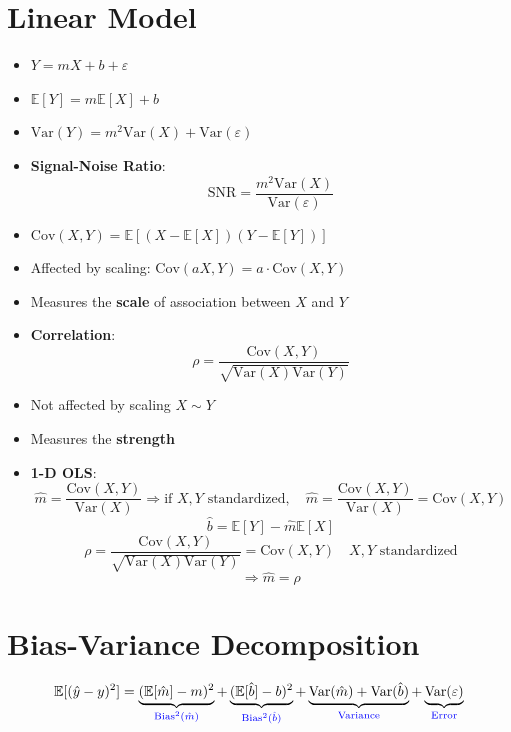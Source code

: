 \documentclass{article}
\begin{document}
\section{Linear Model}
\begin{itemize}
    \item $Y = mX + b + \varepsilon$
    \item $\mathbb{E}[Y] = m\mathbb{E}[X] + b$
    \item $\text{Var}(Y) = m^2\text{Var}(X) + \text{Var}(\varepsilon)$
    \item \textbf{Signal-Noise Ratio}:
        \[
            \text{SNR} = \frac{m^2\text{Var}(X)}{\text{Var}(\varepsilon)}
        \]
    \item $\text{Cov}(X, Y) = \mathbb{E}[(X - \mathbb{E}[X])(Y - \mathbb{E}[Y])]$
    \item Affected by scaling: $\text{Cov}(aX, Y) = a \cdot \text{Cov}(X, Y)$
    \item Measures the \textbf{scale} of association between $X$ and $Y$
    \item \textbf{Correlation}:
        \[
            \rho = \frac{\text{Cov}(X, Y)}{\sqrt{\text{Var}(X)\text{Var}(Y)}}
        \]
    \item Not affected by scaling $X \sim Y$
    \item Measures the \textbf{strength}
    \item \textbf{1-D OLS}:
        \[
            \hat{m} = \frac{\text{Cov}(X, Y)}{\text{Var}(X)} \Rightarrow \text{if } X, Y \text{ standardized}, \quad \hat{m} = \frac{\text{Cov}(X, Y)}{\text{Var}(X)} = \text{Cov}(X, Y)
        \]
        \[
            \hat{b} = \mathbb{E}[Y] - \hat{m}\mathbb{E}[X]
        \]
        \[
            \rho = \frac{\text{Cov}(X, Y)}{\sqrt{\text{Var}(X)\text{Var}(Y)}} = \text{Cov}(X, Y) \quad X, Y \text{ standardized}
        \]
        \[
            \Rightarrow \hat{m} = \rho
        \]
\end{itemize}

\section{Bias-Variance Decomposition}
\[
    \mathbb{E}[(\hat{y} - y)^2] = \underbrace{(\mathbb{E}[\hat{m}] - m)^2}_{\textcolor{blue}{\text{Bias}^2(\hat{m})}} + \underbrace{(\mathbb{E}[\hat{b}] - b)^2}_{\textcolor{blue}{\text{Bias}^2(\hat{b})}} + \underbrace{\text{Var}(\hat{m}) + \text{Var}(\hat{b})}_{\textcolor{blue}{\text{Variance}}} + \underbrace{\text{Var}(\varepsilon)}_{\textcolor{blue}{\text{Error}}}
\]
\end{document}
